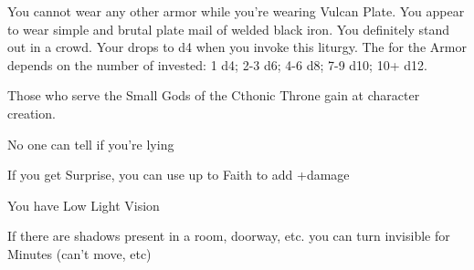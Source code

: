 {\LITURGY [
  Name= Vulcan Plate,
  Link=vulcan-liturgy-plate,
  Paradigm= Force ,
  Save=  N ,
  Duration= Session ,
  Counter=  n/a  ,
  Keywords= None ,
  Target=   Self
]



You cannot wear any other armor while you're wearing Vulcan Plate.  You appear to wear simple and brutal plate mail of welded black iron.  You definitely stand out in a crowd.  Your \MD drops to d4 when you invoke this liturgy.  The \UD for the Armor depends on the number of \DICE invested: 1 d4; 2-3 d6; 4-6 d8; 7-9 d10; 10+ d12.

\newpage





Those who serve the Small Gods of the Cthonic Throne gain \DCUP \DEX at character creation.





\GOD[
Name=Arioch,
Link=small-god-arioch,
GodOf=Fiend of Murder and Betrayal,
Holy=a silver coin with a face on each side
]


No one can tell if you're lying


If you get Surprise, you can use up to \LVL Faith to add +\SUMDICE damage





\GOD[
Name=Erebus,
Link=small-god-erebus,
GodOf=Lord of Shadows,
Holy=a piece of black gauze covering the mouth
]


You have Low Light Vision


If there are shadows present in a room, doorway, etc. you can turn invisible for \SUMDICE Minutes (can't move, etc)




}
